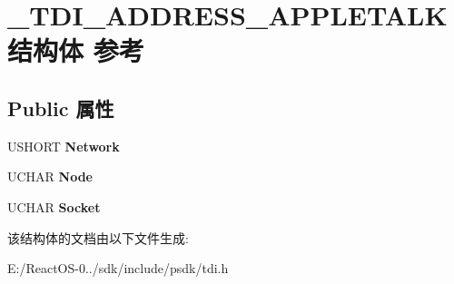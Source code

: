 \hypertarget{struct___t_d_i___a_d_d_r_e_s_s___a_p_p_l_e_t_a_l_k}{}\section{\+\_\+\+T\+D\+I\+\_\+\+A\+D\+D\+R\+E\+S\+S\+\_\+\+A\+P\+P\+L\+E\+T\+A\+L\+K结构体 参考}
\label{struct___t_d_i___a_d_d_r_e_s_s___a_p_p_l_e_t_a_l_k}
\subsection*{Public 属性}
\begin{DoxyCompactItemize}
\item 
\mbox{\label{struct___t_d_i___a_d_d_r_e_s_s___a_p_p_l_e_t_a_l_k_aceeb0b2e3fd1893fe0aeda35b54aa588}} 
U\+S\+H\+O\+RT {\bfseries Network}
\item 
\mbox{\label{struct___t_d_i___a_d_d_r_e_s_s___a_p_p_l_e_t_a_l_k_acd0196fae68a04bc88b51b360621fa86}} 
U\+C\+H\+AR {\bfseries Node}
\item 
\mbox{\label{struct___t_d_i___a_d_d_r_e_s_s___a_p_p_l_e_t_a_l_k_a4e1de0690ff4309cb96fae15ad1a57ed}} 
U\+C\+H\+AR {\bfseries Socket}
\end{DoxyCompactItemize}


该结构体的文档由以下文件生成\+:\begin{DoxyCompactItemize}
\item 
E\+:/\+React\+O\+S-\/0../sdk/include/psdk/tdi.\+h\end{DoxyCompactItemize}
